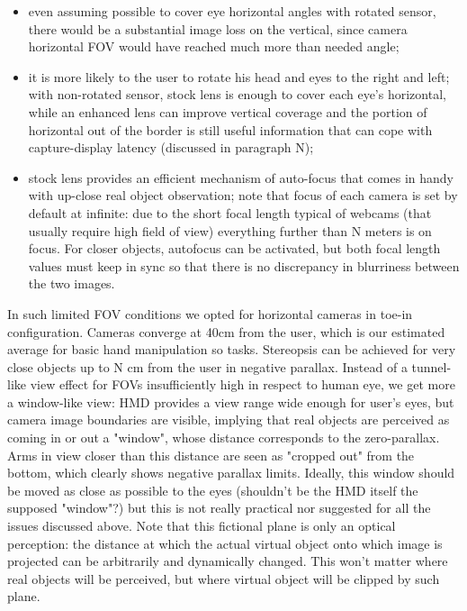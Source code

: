 \begin{itemize}
\item even assuming possible to cover eye horizontal angles with rotated sensor, there would be a substantial image loss on the vertical, since camera horizontal FOV would have reached much more than needed angle;
\item it is more likely to the user to rotate his head and eyes to the right and left; with non-rotated sensor, stock lens is enough to cover each eye’s horizontal, while an enhanced lens can improve vertical coverage and the portion of horizontal out of the border is still useful information that can cope with capture-display latency (discussed in paragraph N);
\item stock lens provides an efficient mechanism of auto-focus that comes in handy with up-close real object observation; note that focus of each camera is set by default at infinite: due to the short focal length typical of webcams (that usually require high field of view) everything further than N meters is on focus. For closer objects, autofocus can be activated, but both focal length values must keep in sync so that there is no discrepancy in blurriness between the two images.
\end{itemize}
In such limited FOV conditions we opted for horizontal cameras in toe-in configuration. Cameras converge at 40cm from the user, which is our estimated average for basic hand manipulation so tasks. Stereopsis can be achieved for very close objects up to N cm from the user in negative parallax. Instead of a tunnel-like view effect for FOVs insufficiently high in respect to human eye, we get more a window-like view: HMD provides a view range wide enough for user’s eyes, but camera image boundaries are visible, implying that real objects are perceived as coming in or out a "window", whose distance corresponds to the zero-parallax. Arms in view closer than this distance are seen as "cropped out" from the bottom, which clearly shows negative parallax limits. Ideally, this window should be moved as close as possible to the eyes (shouldn't be the HMD itself the supposed "window"?) but this is not really practical nor suggested for all the issues discussed above. Note that this fictional plane is only an optical perception: the distance at which the actual virtual object onto which image is projected can be arbitrarily and dynamically changed. This won’t matter where real objects will be perceived, but where virtual object will be clipped by such plane.

